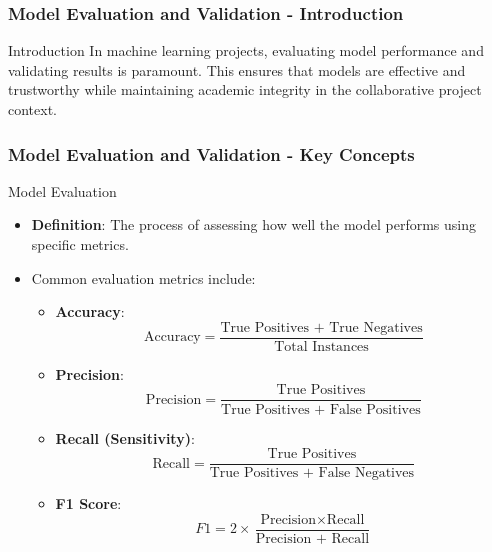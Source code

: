 \documentclass[aspectratio=169]{beamer}
\begin{document}
\begin{frame}[fragile]
    \frametitle{Model Evaluation and Validation - Introduction}
    \begin{block}{Introduction}
        In machine learning projects, evaluating model performance and validating results is paramount. 
        This ensures that models are effective and trustworthy while maintaining academic integrity in the collaborative project context.
    \end{block}
\end{frame}

\begin{frame}[fragile]
    \frametitle{Model Evaluation and Validation - Key Concepts}
    \begin{block}{Model Evaluation}
        \begin{itemize}
            \item \textbf{Definition}: The process of assessing how well the model performs using specific metrics.
            \item Common evaluation metrics include:
            \begin{itemize}
                \item \textbf{Accuracy}: 
                    \[
                    \text{Accuracy} = \frac{\text{True Positives + True Negatives}}{\text{Total Instances}}
                    \]
                \item \textbf{Precision}: 
                    \[
                    \text{Precision} = \frac{\text{True Positives}}{\text{True Positives + False Positives}}
                    \]
                \item \textbf{Recall (Sensitivity)}:
                    \[
                    \text{Recall} = \frac{\text{True Positives}}{\text{True Positives + False Negatives}}
                    \]
                \item \textbf{F1 Score}:
                    \[
                    F1 = 2 \times \frac{\text{Precision} \times \text{Recall}}{\text{Precision + Recall}}
                    \]
            \end{itemize}
        \end{itemize}
    \end{block}
\end{frame}
\end{document}
